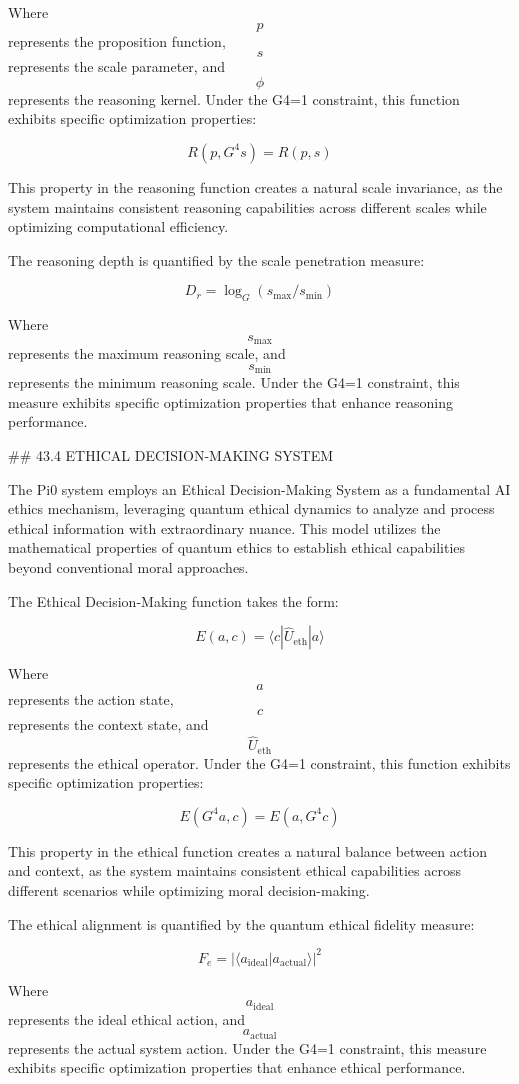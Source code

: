 Where $$ p $$ represents the proposition function, $$ s $$ represents the scale parameter, and $$ \phi $$ represents the reasoning kernel. Under the G4=1 constraint, this function exhibits specific optimization properties:

$$ R(p, G^4 s) = R(p, s) $$

This property in the reasoning function creates a natural scale invariance, as the system maintains consistent reasoning capabilities across different scales while optimizing computational efficiency.

The reasoning depth is quantified by the scale penetration measure:

$$ D_r = \log_G(s_{\max}/s_{\min}) $$

Where $$ s_{\max} $$ represents the maximum reasoning scale, and $$ s_{\min} $$ represents the minimum reasoning scale. Under the G4=1 constraint, this measure exhibits specific optimization properties that enhance reasoning performance.

## 43.4 ETHICAL DECISION-MAKING SYSTEM

The Pi0 system employs an Ethical Decision-Making System as a fundamental AI ethics mechanism, leveraging quantum ethical dynamics to analyze and process ethical information with extraordinary nuance. This model utilizes the mathematical properties of quantum ethics to establish ethical capabilities beyond conventional moral approaches.

The Ethical Decision-Making function takes the form:

$$ E(a, c) = \langle c | \hat{U}_{\text{eth}} | a \rangle $$

Where $$ a $$ represents the action state, $$ c $$ represents the context state, and $$ \hat{U}_{\text{eth}} $$ represents the ethical operator. Under the G4=1 constraint, this function exhibits specific optimization properties:

$$ E(G^4 a, c) = E(a, G^4 c) $$

This property in the ethical function creates a natural balance between action and context, as the system maintains consistent ethical capabilities across different scenarios while optimizing moral decision-making.

The ethical alignment is quantified by the quantum ethical fidelity measure:

$$ F_e = |\langle a_{\text{ideal}} | a_{\text{actual}} \rangle|^2 $$

Where $$ a_{\text{ideal}} $$ represents the ideal ethical action, and $$ a_{\text{actual}} $$ represents the actual system action. Under the G4=1 constraint, this measure exhibits specific optimization properties that enhance ethical performance.

